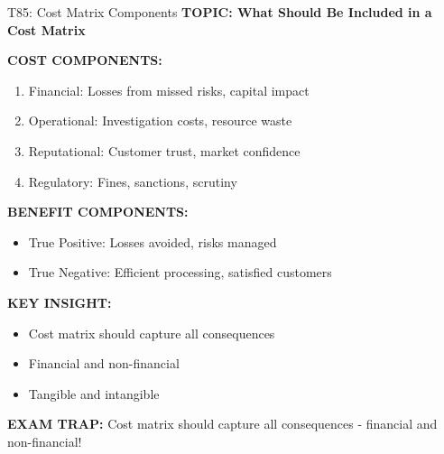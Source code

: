 \documentclass[8pt]{beamer}
\begin{document}
	\begin{frame}{T85: Cost Matrix Components}
		\fontsize{6.5}{7.5}\selectfont
		\textbf{TOPIC: What Should Be Included in a Cost Matrix}
		
		\vspace{0.1cm}
		\textbf{COST COMPONENTS:}
		\begin{enumerate}
			\item \textcolor{myblue}{Financial:} Losses from missed risks, capital impact
			\item \textcolor{myblue}{Operational:} Investigation costs, resource waste
			\item \textcolor{myblue}{Reputational:} Customer trust, market confidence
			\item \textcolor{myblue}{Regulatory:} Fines, sanctions, scrutiny
		\end{enumerate}
		
		\vspace{0.1cm}
		\textbf{BENEFIT COMPONENTS:}
		\begin{itemize}
			\item \textcolor{myblue}{True Positive:} Losses avoided, risks managed
			\item \textcolor{myblue}{True Negative:} Efficient processing, satisfied customers
		\end{itemize}
		
		\vspace{0.1cm}
		\textbf{KEY INSIGHT:}
		\begin{itemize}
			\item Cost matrix should capture all consequences
			\item Financial and non-financial
			\item Tangible and intangible
		\end{itemize}
		
		\textcolor{myred}{\textbf{EXAM TRAP:}} Cost matrix should capture \textcolor{myblue}{all consequences} - financial and non-financial!
	\end{frame}
	
\end{document}
